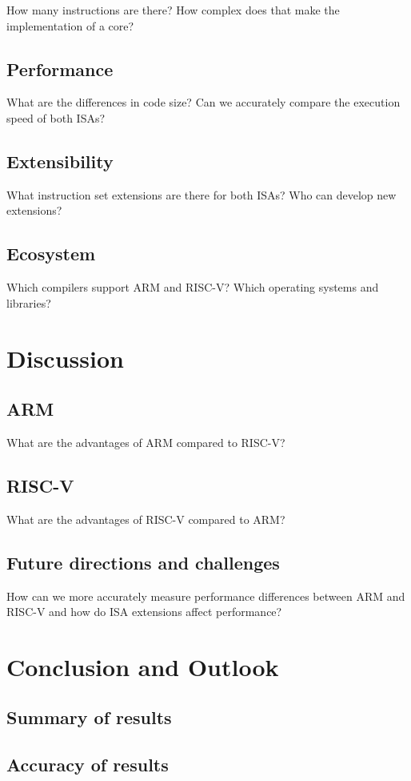 \documentclass[conference]{IEEEtran}
\begin{document}
	How many instructions are there? How complex does that make the implementation of a core?
	\subsection{Performance}
	What are the differences in code size? Can we accurately compare the execution speed of both ISAs?
	\subsection{Extensibility}
	What instruction set extensions are there for both ISAs? Who can develop new extensions?
	\subsection{Ecosystem}
	Which compilers support ARM and RISC-V? Which operating systems and libraries?


\section{Discussion}
\label{ref:discussion}
	\subsection{ARM}
	What are the advantages of ARM compared to RISC-V?
	\subsection{RISC-V}
	What are the advantages of RISC-V compared to ARM?
	\subsection{Future directions and challenges}
	How can we more accurately measure performance differences between ARM and RISC-V and how do ISA extensions affect performance?

\section{Conclusion and Outlook}
\label{ref:conclusion}
	\subsection{Summary of results}
	\subsection{Accuracy of results}
\end{document}
